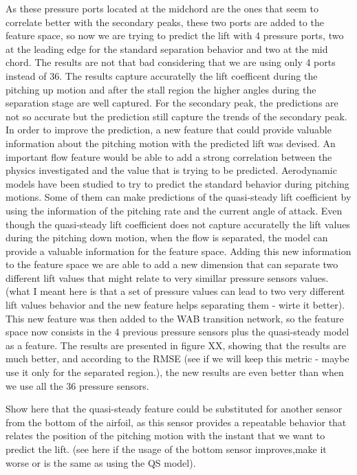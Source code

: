 \documentclass[%
 reprint,
 amsmath,amssymb,
 aps,
]{revtex4-2}
\begin{document}
As these pressure ports located at the midchord are the ones that seem to correlate better with the secondary peaks, these two ports are added to the feature space, so now we are trying to predict the lift with 4 pressure ports, two at the leading edge for the standard separation behavior and two at the mid chord. 
The results are not that bad considering that we are using only 4 ports instead of 36. 
The results capture accuratelly the lift coefficent during the pitching up motion and after the stall region the higher angles during the separation stage are well captured. 
For the secondary peak, the predictions are not so accurate but the prediction still capture the trends of the secondary peak.
In order to improve the prediction, a new feature that could provide valuable information about the pitching motion with the predicted lift was devised. 
An important flow feature would be able to add a strong correlation between the physics investigated and the value that is trying to be predicted. 
Aerodynamic models have been studied to try to predict the standard behavior during pitching motions. 
Some of them can make predictions of the quasi-steady lift coefficient by using the information of the pitching rate and the current angle of attack. 
Even though the quasi-steady lift coefficient does not capture accuratelly the lift values during the pitching down motion, when the flow is separated, the model can provide a valuable information for the feature space. 
Adding this new information to the feature space we are able to add a new dimension that can separate two different lift values that might relate to very simillar pressure sensors values. 
(what I meant here is that a set of pressure values can lead to two very different lift values behavior and the new feature helps separating them - wirte it better). 
This new feature was then added to the WAB transition network, so the feature space now consists in the 4 previous pressure sensors plus the quasi-steady model as a feature. 
The results are presented in figure XX, showing that the results are much better, and according to the RMSE (see if we will keep this metric - maybe use it only for the separated region.), the new results are even better than when we use all the 36 pressure sensors.

Show here that the quasi-steady feature could be substituted for another sensor from the bottom of the airfoil, as this sensor provides a repeatable behavior that relates the position of the pitching motion with the instant that we want to predict the lift. 
(see here if the usage of the bottom sensor improves,make it worse or is the same as using the QS model). 
\end{document}
